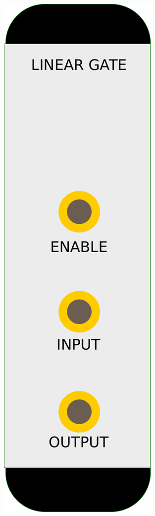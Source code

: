 \begin{figure}[ht]
  \includegraphics[height=0.25\textheight]{BilderAufbau/linear_gate.pdf}

\end{figure}
